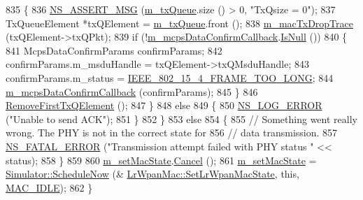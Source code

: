 \begin{DoxyCode}
835         \{
836           \hyperlink{assert_8h_aff5ece9066c74e681e74999856f08539}{NS\_ASSERT\_MSG} (\hyperlink{classns3_1_1LrWpanMac_a90ea1fb2b1cec84e8ca2177772a1644d}{m\_txQueue}.size () > 0, \textcolor{stringliteral}{"TxQsize = 0"});
837           TxQueueElement *txQElement = \hyperlink{classns3_1_1LrWpanMac_a90ea1fb2b1cec84e8ca2177772a1644d}{m\_txQueue}.front ();
838           \hyperlink{classns3_1_1LrWpanMac_a3ff373bbe119ee781fda57327163b43a}{m\_macTxDropTrace} (txQElement->txQPkt);
839           \textcolor{keywordflow}{if} (!\hyperlink{classns3_1_1LrWpanMac_a05eba7a98d1cbbf86151290069e093e0}{m\_mcpsDataConfirmCallback}.\hyperlink{classns3_1_1Callback_aa8e27826badbf37f84763f36f70d9b54}{IsNull} ())
840             \{
841               McpsDataConfirmParams confirmParams;
842               confirmParams.m\_msduHandle = txQElement->txQMsduHandle;
843               confirmParams.m\_status = \hyperlink{group__lr-wpan_gga50d67c8816b2ca8da8df30d045b1b705ab8d737a09f0b50d7c2dc000179e9e38d}{IEEE\_802\_15\_4\_FRAME\_TOO\_LONG};
844               \hyperlink{classns3_1_1LrWpanMac_a05eba7a98d1cbbf86151290069e093e0}{m\_mcpsDataConfirmCallback} (confirmParams);
845             \}
846           \hyperlink{classns3_1_1LrWpanMac_a359da7ecf2f56e4f62f5e8173bf989dd}{RemoveFirstTxQElement} ();
847         \}
848       \textcolor{keywordflow}{else}
849         \{
850           \hyperlink{group__logging_ga0261a8db1d4ac5f79417d117634fd455}{NS\_LOG\_ERROR} (\textcolor{stringliteral}{"Unable to send ACK"});
851         \}
852     \}
853   \textcolor{keywordflow}{else}
854     \{
855       \textcolor{comment}{// Something went really wrong. The PHY is not in the correct state for}
856       \textcolor{comment}{// data transmission.}
857       \hyperlink{group__fatal_ga5131d5e3f75d7d4cbfd706ac456fdc85}{NS\_FATAL\_ERROR} (\textcolor{stringliteral}{"Transmission attempt failed with PHY status "} << status);
858     \}
859 
860   \hyperlink{classns3_1_1LrWpanMac_a764e1cada16e9fc51d9863963d962823}{m\_setMacState}.\hyperlink{classns3_1_1EventId_a993ae94e48e014e1afd47edb16db7a11}{Cancel} ();
861   \hyperlink{classns3_1_1LrWpanMac_a764e1cada16e9fc51d9863963d962823}{m\_setMacState} = \hyperlink{classns3_1_1Simulator_a2219ee02c0647adc83d1c918c3256266}{Simulator::ScheduleNow} (&
      \hyperlink{classns3_1_1LrWpanMac_a6749a353feb70bbb851b03477f56dc69}{LrWpanMac::SetLrWpanMacState}, \textcolor{keyword}{this}, \hyperlink{group__lr-wpan_gga02ee7efd682937a8781f5e6101f61884a091c013ccdbce1011c1a4e141b227730}{MAC\_IDLE});
862 \}
\end{DoxyCode}


